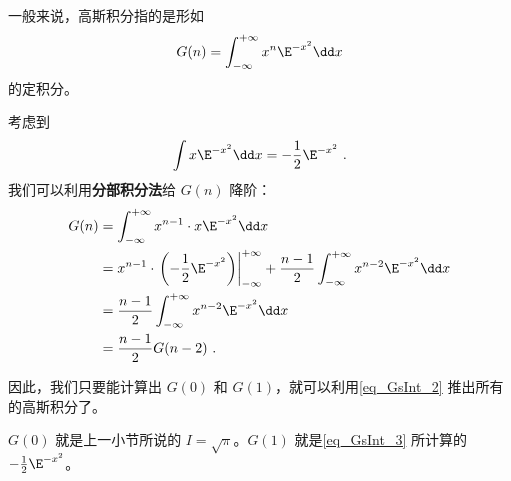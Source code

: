 一般来说，高斯积分指的是形如
\begin{equation}
G(n)=\int_{-\infty}^{+\infty} x^n\E^{-x^2}\dd x
\end{equation}
的定积分。

考虑到
\begin{equation}\label{eq_GsInt_3}
\int x\E^{-x^2}\dd x=-\frac{1}{2}\E^{-x^2}~.
\end{equation}
我们可以利用\textbf{分部积分法}给 $G(n)$ 降阶：
\begin{equation}\label{eq_GsInt_2}
\begin{aligned}
G(n)&=\int_{-\infty}^{+\infty} x^{n-1}\cdot x\E^{-x^2}\dd x\\
&=x^{n-1}\cdot\left.\left(-\frac{1}{2}\E^{-x^2}\right)\right|_{-\infty}^{+\infty}+\frac{n-1}{2}\int_{-\infty}^{+\infty} x^{n-2}\E^{-x^2}\dd x\\
&=\frac{n-1}{2}\int_{-\infty}^{+\infty} x^{n-2}\E^{-x^2}\dd x\\
&=\frac{n-1}{2}G(n-2)~.
\end{aligned}
\end{equation}

因此，我们只要能计算出 $G(0)$ 和 $G(1)$，就可以利用\autoref{eq_GsInt_2} 推出所有的高斯积分了。

$G(0)$ 就是上一小节所说的 $I=\sqrt{\pi}$。$G(1)$ 就是\autoref{eq_GsInt_3} 所计算的 $-\frac{1}{2}\E^{-x^2}$。









